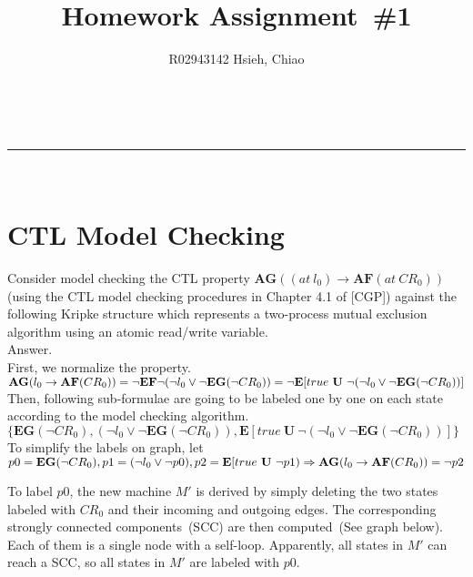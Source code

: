\documentclass[a4paper,11pt]{article}
\makeatletter
\newcommand{\linia}{\rule{\linewidth}{0.5pt}}
\theoremstyle{mytheor}
\renewcommand{\maketitle}{
\begin{center}
\vspace{2ex}
{\huge \textsc{\@title}}
\vspace{1ex}
\\
\linia\\
\@author \hfill \@date
\vspace{4ex}
\end{center}
}
\makeatother
\begin{document}
\title{Homework Assignment~\#1}

\author{R02943142 Hsieh, Chiao}


\maketitle

\section{CTL Model Checking}
Consider model checking the CTL property 
$\textbf{AG}((at\ l_0) \to \textbf{AF}(at\ CR_0))$
(using the CTL model checking procedures in Chapter 4.1 of [CGP]) against the
following Kripke structure which represents a two-process mutual exclusion
algorithm using an atomic read/write variable.
\medskip \\
Answer.
\smallskip \\
First, we normalize the property.
\smallskip \\
$
\textbf{AG}(l_0 \to \textbf{AF}(CR_0)) \\
= \neg \textbf{EF} \neg (\neg l_0 \lor \neg \textbf{EG}(\neg CR_0)) \\
= \neg \textbf{E} [ true\ \textbf{U}\ \neg (\neg l_0 \lor \neg \textbf{EG}(\neg CR_0)) ]
$
\smallskip \\
Then, following sub-formulae are going to be labeled one by one on each state 
according to the model checking algorithm.\\
$
\{
\textbf{EG}(\neg CR_0), 
(\neg l_0 \lor \neg \textbf{EG}(\neg CR_0)),
\textbf{E} [ true\ \textbf{U}\ \neg (\neg l_0 \lor \neg \textbf{EG}(\neg CR_0)) ]
\}
$
\smallskip \\
To simplify the labels on graph, let \\
$
p0 = \textbf{EG}(\neg CR_0), \\
p1 = (\neg l_0 \lor \neg p0), \\
p2 = \textbf{E} [ true\ \textbf{U}\ \neg p1) \\
\Rightarrow \textbf{AG}(l_0 \to \textbf{AF}(CR_0)) = \neg p2
$

To label $p0$, the new machine $M'$ is derived by simply deleting the two 
states labeled with $CR_0$ and their incoming and outgoing edges. The
corresponding strongly connected components~(SCC) are then computed~(See graph
below). Each of them is a single node with a self-loop. Apparently, all states 
in $M'$ can reach a SCC, so all states in $M'$ are labeled with $p0$.
\end{document}
